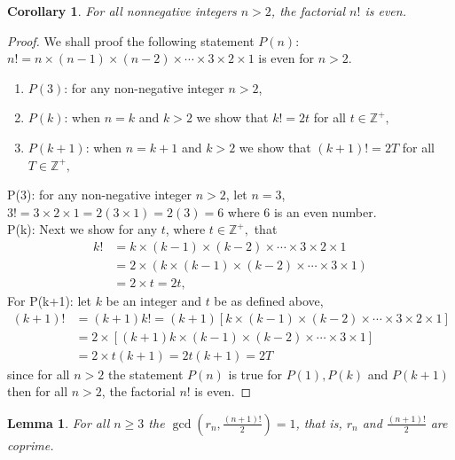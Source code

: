 \documentclass[pdflatex,sn-mathphys-num]{sn-jnl}%
\newtheorem{lemma}{Lemma}
\newtheorem{corollary}{Corollary}
\theoremstyle{thmstyleone}%
\theoremstyle{thmstyletwo}%
\theoremstyle{thmstylethree}%
\newcommand{\BZ}{\mathbb{Z}}
\begin{document}
\begin{corollary}\label{cor}
    For all nonnegative integers $n>2$, the factorial $n!$ is even.
\end{corollary}

\begin{proof}
    We shall proof the following statement  $P(n)$: $n!=n\times(n-1)\times(n-2)\times \cdots \times 3\times 2 \times1$ is even for $n>2.$
    \begin{enumerate}
        \item  $P(3)$: for any non-negative integer $n>2$,
\item $P(k)$: when $n=k$ and $k>2$ we show that $k!=2t$ for all $t\in \BZ^+,$ 
\item $P(k+1)$: when $n=k+1$ and $k>2$ we show that $(k+1)!=2T$ for all $T\in \BZ^+,$ 
 \end{enumerate}
P(3): for any non-negative integer $n>2$, let $n=3$, $3!=3\times 2 \times 1=2(3\times 1)=2(3)=6$ where $6$ is an even number.\\
P(k): Next we show for any $t$, where $t\in \BZ^+,$ that
\begin{align*}
    k!&=k\times(k-1)\times(k-2)\times \cdots \times 3\times 2 \times1\\
    &= 2\times ( k\times(k-1)\times(k-2)\times \cdots \times 3 \times1)\\
    &=2 \times t= 2t,
\end{align*}
For P(k+1): let $k$ be an integer and $t$ be as defined above,
\begin{align*}
    (k+1)!&=(k+1)k!=(k+1)[k\times(k-1)\times(k-2)\times \cdots \times 3\times 2 \times1]\\
    &= 2\times [ (k+1)k\times(k-1)\times(k-2)\times \cdots \times 3 \times1]\\
    &=2 \times t(k+1)= 2t(k+1)=2T
\end{align*}
since for all $n>2$ the statement $P(n)$ is true for $P(1), P(k)$ and $P(k+1)$ then for all  $n>2$, the factorial $n!$ is even.
\end{proof}

\begin{lemma}\label{cp}
   For all $n\geq3$ the $\gcd(r_{n},\frac{(n+1)!}{2})=1$, that is, $r_n$ and $\frac{(n+1)!}{2}$ are coprime.
\end{lemma}
\end{document}
